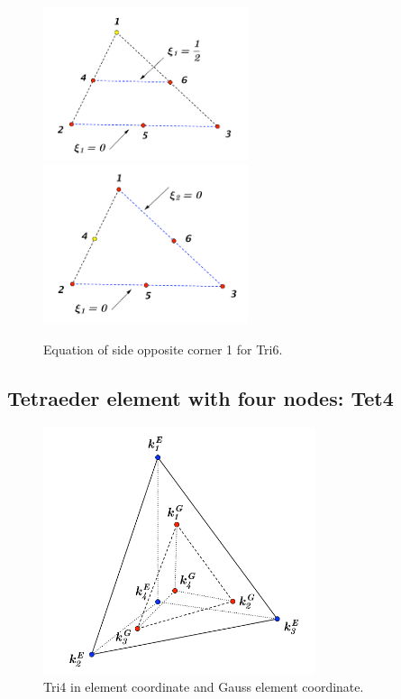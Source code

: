 \begin{figure}[h]
	\begin{center}
		\includegraphics[width=6cm,clip]{Tri6_2.pdf}		
		\includegraphics[width=6cm,clip]{Tri6_3.pdf}		
		\caption{Equation of side opposite corner 1 for Tri6.} \label{fig: Tri6_2}
		
	\end{center} 
\end{figure}


\subsection{Tetraeder element with four nodes: Tet4}

\begin{figure}[h]
	\begin{center}
		\includegraphics[width=8cm,clip]{Tet4_1.pdf}			
		\caption{Tri4 in element coordinate and Gauss element coordinate.}
	\end{center} 
\end{figure}

